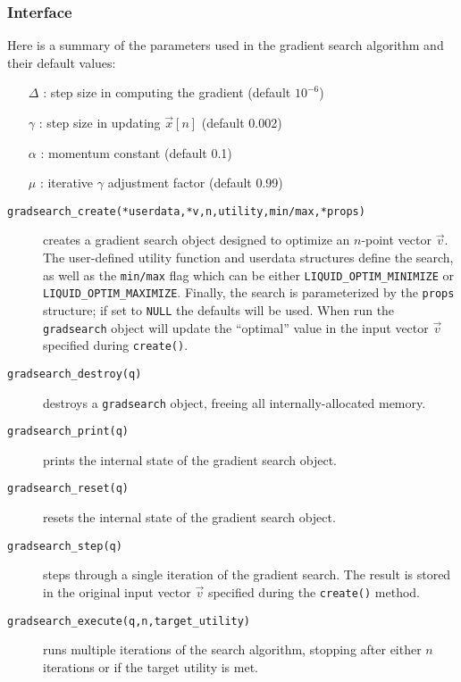 \subsubsection{Interface}
Here is a summary of the parameters used in the gradient search algorithm and
their default values:
\begin{itemize}
\item[$\Delta$] : step size in computing the gradient (default $10^{-6}$)
\item[$\gamma$] : step size in updating $\vec{x}[n]$ (default 0.002)
\item[$\alpha$] : momentum constant (default 0.1)
\item[$\mu$]    : iterative $\gamma$ adjustment factor (default 0.99)
\end{itemize}
%
\begin{description}
\item[{\tt gradsearch\_create(*userdata,*v,n,utility,min/max,*props)}]
    creates a gradient search object designed to optimize an $n$-point
    vector $\vec{v}$.
    The user-defined utility function and userdata structures define the
    search, as well as the {\tt min/max} flag which can be either
    {\tt LIQUID\_OPTIM\_MINIMIZE} or
    {\tt LIQUID\_OPTIM\_MAXIMIZE}.
    Finally, the search is parameterized by the {\tt props} structure;
    if set to {\tt NULL} the defaults will be used.
    When run the {\tt gradsearch} object will update the ``optimal''
    value in the input vector $\vec{v}$ specified during
    {\tt create()}.
\item[{\tt gradsearch\_destroy(q)}]
    destroys a {\tt gradsearch} object, freeing all internally-allocated
    memory.
\item[{\tt gradsearch\_print(q)}]
    prints the internal state of the gradient search object.
\item[{\tt gradsearch\_reset(q)}]
    resets the internal state of the gradient search object.
\item[{\tt gradsearch\_step(q)}]
    steps through a single iteration of the gradient search.
    The result is stored in the original input vector $\vec{v}$
    specified during the {\tt create()} method.
\item[{\tt gradsearch\_execute(q,n,target\_utility)}]
    runs multiple iterations of the search algorithm,
    stopping after either $n$ iterations or if the target utility is
    met.
\end{description}
